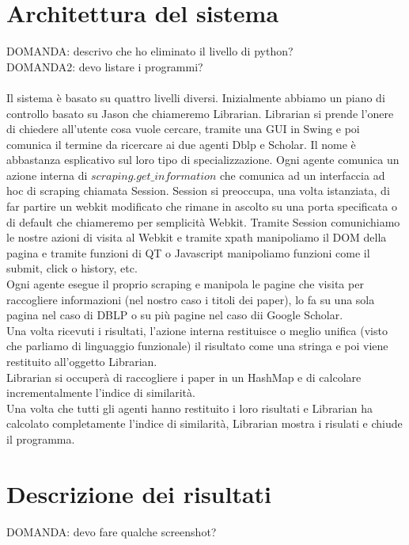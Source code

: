 \documentclass[12pt]{article}
\begin{document}
\section{Architettura del sistema}
DOMANDA: descrivo che ho eliminato il livello di python? \\
DOMANDA2: devo listare i programmi? \\
\\
Il sistema \`e basato su quattro livelli diversi. Inizialmente abbiamo un piano di controllo basato su Jason che chiameremo Librarian. Librarian si prende l'onere di chiedere all'utente cosa vuole cercare, tramite una GUI in Swing e poi comunica il termine da ricercare ai due agenti Dblp e Scholar. Il nome \`e abbastanza esplicativo sul loro tipo di specializzazione. Ogni agente comunica un azione interna di $scraping.get\_information$ che comunica ad un interfaccia ad hoc di scraping chiamata Session. Session si preoccupa, una volta istanziata, di far partire un webkit modificato che rimane in ascolto su una porta specificata o di default che chiameremo per semplicit\`a Webkit. Tramite Session comunichiamo le nostre azioni di visita al Webkit e tramite xpath manipoliamo il DOM della pagina e tramite funzioni di QT o Javascript manipoliamo funzioni come il submit, click o history, etc. \\
Ogni agente esegue il proprio scraping e manipola le pagine che visita per raccogliere informazioni (nel nostro caso i titoli dei paper), lo fa su una sola pagina nel caso di DBLP o su pi\`u pagine nel caso dii Google Scholar.\\
Una volta ricevuti i risultati, l'azione interna restituisce o meglio unifica (visto che parliamo di linguaggio funzionale) il risultato come una stringa e poi viene restituito all'oggetto Librarian. \\
Librarian si occuper\`a di raccogliere i paper in un HashMap e di calcolare incrementalmente l'indice di similarit\`a. \\
Una volta che tutti gli agenti hanno restituito i loro risultati e Librarian ha calcolato completamente l'indice di similarit\`a, Librarian mostra i risulati e chiude il programma. 

\section{Descrizione dei risultati}
DOMANDA: devo fare qualche screenshot? \\
\end{document}
